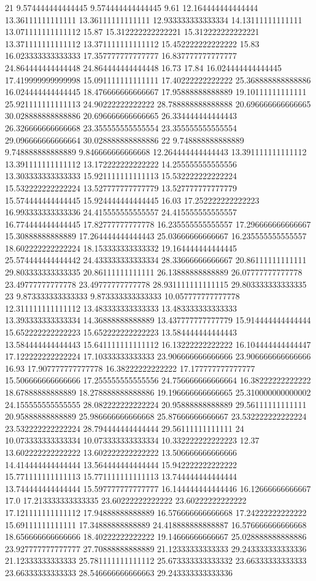 21 9.574444444444445 9.574444444444445 9.61 12.164444444444444 13.36111111111111 13.36111111111111 12.933333333333334 14.13111111111111 13.071111111111112 15.87 15.312222222222221 15.312222222222221 13.371111111111112 13.371111111111112 15.452222222222222 15.83 16.023333333333333 17.357777777777777 16.837777777777777 24.864444444444448 24.864444444444448 16.73 17.84 16.024444444444445 17.419999999999998 15.091111111111111 17.40222222222222 25.368888888888886 16.024444444444445 18.476666666666667 17.95888888888889 19.10111111111111 25.921111111111113 24.90222222222222 28.788888888888888 20.696666666666665 30.028888888888886 20.696666666666665 26.334444444444443 26.326666666666668 23.355555555555554 23.355555555555554 29.096666666666664 30.028888888888886
22 9.748888888888889 9.748888888888889 9.846666666666668 12.264444444444443 13.391111111111112 13.391111111111112 13.172222222222222 14.255555555555556 13.303333333333333 15.921111111111113 15.532222222222224 15.532222222222224 13.527777777777779 13.527777777777779 15.574444444444445 15.924444444444445 16.03 17.252222222222223 16.993333333333336 24.415555555555557 24.415555555555557 16.774444444444445 17.82777777777778 16.235555555555557 17.296666666666667 15.30888888888889 17.264444444444443 25.03666666666667 16.235555555555557 18.602222222222224 18.153333333333332 19.164444444444445 25.574444444444442 24.433333333333334 28.33666666666667 20.86111111111111 29.803333333333335 20.86111111111111 26.13888888888889 26.07777777777778 23.49777777777778 23.49777777777778 28.931111111111115 29.803333333333335
23 9.873333333333333 9.873333333333333 10.057777777777778 12.311111111111112 13.483333333333333 13.483333333333333 13.393333333333334 14.36888888888889 13.437777777777779 15.914444444444444 15.652222222222223 15.652222222222223 13.584444444444443 13.584444444444443 15.641111111111112 16.13222222222222 16.104444444444447 17.122222222222224 17.10333333333333 23.906666666666666 23.906666666666666 16.93 17.907777777777778 16.38222222222222 17.177777777777777 15.506666666666666 17.255555555555556 24.756666666666664 16.38222222222222 18.67888888888889 18.278888888888886 19.196666666666665 25.310000000000002 24.155555555555555 28.082222222222224 20.95888888888889 29.56111111111111 20.95888888888889 25.986666666666668 25.87666666666667 23.532222222222224 23.532222222222224 28.794444444444444 29.56111111111111
24 10.073333333333334 10.073333333333334 10.332222222222223 12.37 13.602222222222222 13.602222222222222 13.506666666666666 14.414444444444444 13.564444444444444 15.942222222222222 15.771111111111113 15.771111111111113 13.744444444444444 13.744444444444444 15.597777777777777 16.144444444444446 16.12666666666667 17.0 17.213333333333335 23.60222222222222 23.60222222222222 17.121111111111112 17.94888888888889 16.576666666666668 17.24222222222222 15.69111111111111 17.34888888888889 24.418888888888887 16.576666666666668 18.656666666666666 18.40222222222222 19.14666666666667 25.028888888888886 23.927777777777777 27.70888888888889 21.12333333333333 29.243333333333336 21.12333333333333 25.781111111111112 25.673333333333332 23.66333333333333 23.66333333333333 28.546666666666663 29.243333333333336

